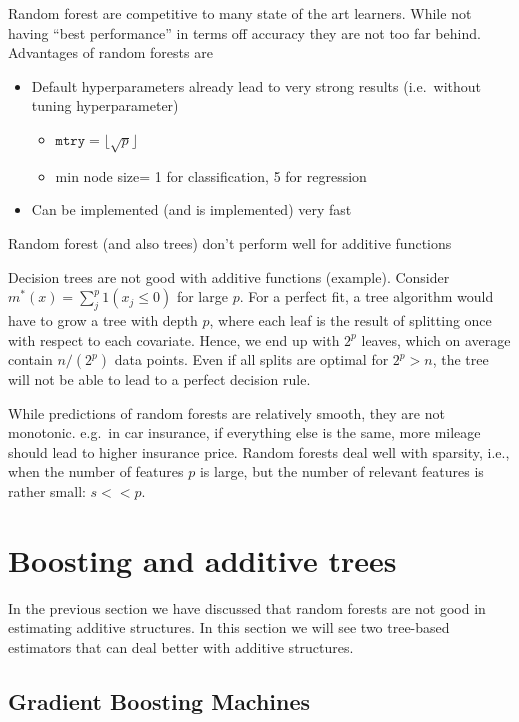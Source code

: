 \documentclass[a4paper,12pt,openany]{book}
\providecommand{\tightlist}{%
 \setlength{\itemsep}{0pt}\setlength{\parskip}{0pt}}
\begin{document}
Random forest are competitive to many state of the art learners. While not having ``best performance'' in terms off accuracy they are not too far behind. Advantages of random forests are

\begin{itemize}
\tightlist
\item
  Default hyperparameters already lead to very strong results (i.e.~without tuning hyperparameter)

  \begin{itemize}
  \tightlist
  \item
    \(\texttt {mtry}=\lfloor \sqrt{p}\rfloor\)
  \item
    min node size= 1 for classification, 5 for regression
  \end{itemize}
\item
  Can be implemented (and is implemented) very fast
\end{itemize}

Random forest (and also trees) don't perform well for additive functions

Decision trees are not good with additive functions (example). Consider \(m^\ast(x) = \sum_j^p 1(x_j \leq 0)\) for large \(p\). For a perfect fit, a tree algorithm would have to grow a tree with depth \(p\),
where each leaf is the result of splitting once with respect to each covariate. Hence, we end up with \(2^p\) leaves, which on average contain \(n/(2^p)\) data points. Even if all splits are optimal for \(2^p>n\), the tree will not be able to lead to a perfect decision rule.

While predictions of random forests are relatively smooth, they are not monotonic. e.g.~in car insurance, if everything else is the same, more mileage should lead to higher insurance price. Random forests deal well with sparsity, i.e., when the number of features \(p\) is large, but the number of relevant features is rather small: \(s<<p\).

\hypertarget{boosting-and-additive-trees}{%
\section{Boosting and additive trees}\label{boosting-and-additive-trees}}

In the previous section we have discussed that random forests are not good in estimating additive structures. In this section we will see two tree-based estimators that can deal better with additive structures.

\hypertarget{gradient-boosting-machines}{%
\subsection{Gradient Boosting Machines}\label{gradient-boosting-machines}}
\end{document}
